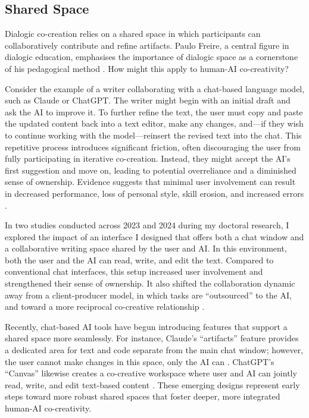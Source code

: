 \subsection{Shared Space}

Dialogic co-creation relies on a shared space in which participants can collaboratively contribute and refine artifacts. Paulo Freire, a central figure in dialogic education, emphasises the importance of dialogic space as a cornerstone of his pedagogical method \cite{Freire1970-pa}. How might this apply to human-AI co-creativity?

Consider the example of a writer collaborating with a chat-based language model, such as Claude or ChatGPT. The writer might begin with an initial draft and ask the AI to improve it. To further refine the text, the user must copy and paste the updated content back into a text editor, make any changes, and—if they wish to continue working with the model—reinsert the revised text into the chat. This repetitive process introduces significant friction, often discouraging the user from fully participating in iterative co-creation. Instead, they might accept the AI’s first suggestion and move on, leading to potential overreliance and a diminished sense of ownership. Evidence suggests that minimal user involvement can result in decreased performance, loss of personal style, skill erosion, and increased errors \cite{Abbas2024-sf, Rafner2021-tm}.

In two studies conducted across 2023 and 2024 during my doctoral research, I explored the impact of an interface I designed that offers both a chat window and a collaborative writing space shared by the user and AI. In this environment, both the user and the AI can read, write, and edit the text. Compared to conventional chat interfaces, this setup increased user involvement and strengthened their sense of ownership. It also shifted the collaboration dynamic away from a client-producer model, in which tasks are “outsourced” to the AI, and toward a more reciprocal co-creative relationship \cite{Ocampo2024-dv}.

Recently, chat-based AI tools have begun introducing features that support a shared space more seamlessly. For instance, Claude’s “artifacts” feature provides a dedicated area for text and code separate from the main chat window; however, the user cannot make changes in this space, only the AI can \cite{Whitney2024-pp, Anthropic2024-dl}. ChatGPT’s “Canvas” likewise creates a co-creative workspace where user and AI can jointly read, write, and edit text-based content \cite{OpenAI2024-ug}. These emerging designs represent early steps toward more robust shared spaces that foster deeper, more integrated human-AI co-creativity.

